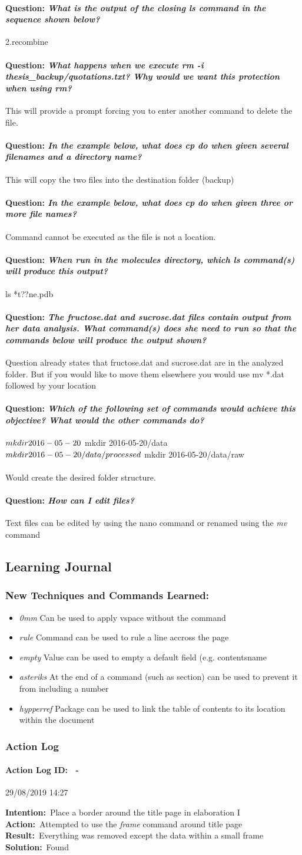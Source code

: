\documentclass[12pt]{article}
\newcounter{problem} \setcounter{problem}{1}
\newcommand{\actionlog}[1]{\paragraph{Action Log ID: \theproblem\ -}{#1} ~\\ \addtocounter{problem}{1}}
\newcommand{\intention}[1]{\textbf{Intention:}{\textnormal\ #1} \newline}
\newcommand{\action}[1]{\textbf{Action:}{\textnormal\ #1} \newline}
\newcommand{\result}[1]{\textbf{Result:}{\textnormal\ #1} \newline}
\newcommand{\solution}[1]{\textbf{Solution:}{\textnormal\ #1} \newline}
\newcommand{\learning}[2]{\item \textit{#1} \textnormal{#2}}
\newcommand{\question}[1]{\paragraph{Question: {\textnormal{\textit{#1}}} ~\\}}
\begin{document}
\question{What is the output of the closing ls command in the sequence shown below?}
2.recombine

\question{What happens when we execute rm -i thesis\_backup/quotations.txt? Why would we want this protection when using rm?}
This will provide a prompt forcing you to enter another command to delete the file.

\question{In the example below, what does cp do when given several filenames and a directory name?}
This will copy the two files into the destination folder (backup)

\question{In the example below, what does cp do when given three or more file names?}
Command cannot be executed as the file is not a location.

\question{When run in the molecules directory, which ls command(s) will produce this output?}
ls *t??ne.pdb

\question{The fructose.dat and sucrose.dat files contain output from her data analysis. What command(s) does she need to run so that the commands below will produce the output shown?}
Question already states that fructose.dat and sucrose.dat are in the analyzed folder. But if you would like to move them elsewhere you would use mv *.dat followed by your location

\question{Which of the following set of commands would achieve this objective? What would the other commands do?}
$ mkdir 2016-05-20\\
$ mkdir 2016-05-20/data\\
$ mkdir 2016-05-20/data/processed\\
$ mkdir 2016-05-20/data/raw\\
\\
Would create the desired folder structure.

\question{How can I edit files?}
Text files can be edited by using the nano command or renamed using the \textit{mv} command

\subsection{Learning Journal}
\subsubsection{New Techniques and Commands Learned:}
\begin{itemize}
    \learning{0mm}{Can be used to apply vspace without the command}
    \learning{rule}{Command can be used to rule a line accross the page}
    \learning{empty}{Value can be used to empty a default field (e.g. contentsname}
    \learning{asteriks}{At the end of a command (such as section) can be used to prevent it from including a number}
    \learning{hypperref}{Package can be used to link the table of contents to its location within the document}
\end{itemize}

\subsubsection{Action Log}

\actionlog{29/08/2019 14:27}
\intention{Place a border around the title page in elaboration I}
\action{Attempted to use the \textit{frame} command around title page}
\result{Everything was removed except the data within a small frame}
\solution{Found }

\end{document}
